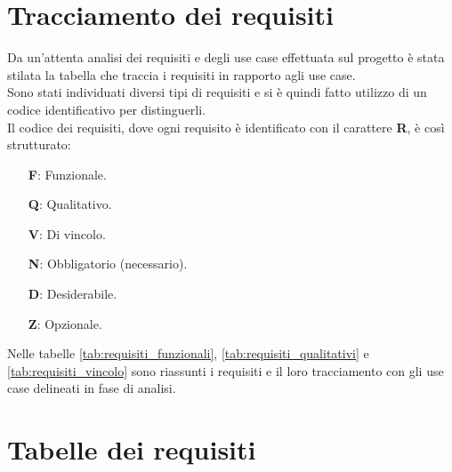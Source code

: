 \section{Tracciamento dei requisiti}
Da un'attenta analisi dei requisiti e degli use case effettuata sul progetto è stata stilata la tabella che traccia i requisiti in rapporto agli use case.\\
Sono stati individuati diversi tipi di requisiti e si è quindi fatto utilizzo di un codice identificativo per distinguerli.\\
Il codice dei requisiti, dove ogni requisito è identificato con il carattere \textbf{R}, è così strutturato:
\begin{enumerate}
    \item[\textbf{F}:] Funzionale.
    \item[\textbf{Q}:] Qualitativo.
    \item[\textbf{V}:] Di vincolo.
    \item[\textbf{N}:] Obbligatorio (necessario).
    \item[\textbf{D}:] Desiderabile.
    \item[\textbf{Z}:] Opzionale.
\end{enumerate}

Nelle tabelle \ref{tab:requisiti_funzionali}, \ref{tab:requisiti_qualitativi} e \ref{tab:requisiti_vincolo} sono riassunti i requisiti e il loro tracciamento con gli use case delineati in fase di analisi.

\section{Tabelle dei requisiti}


